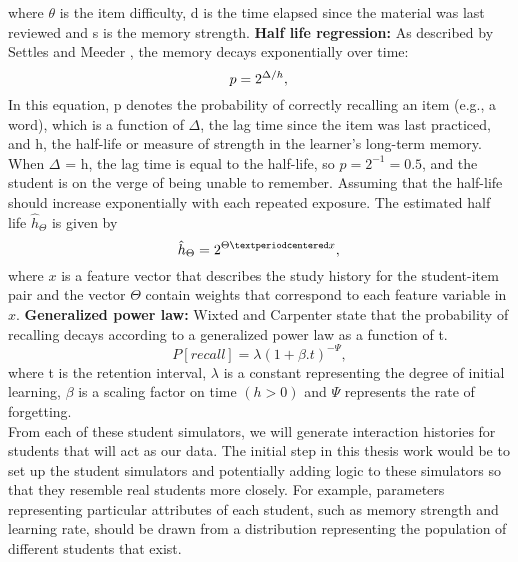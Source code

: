 \documentclass[12pt]{article}
\begin{document}
where $\theta$ is the item difficulty, d is the time elapsed since the material was last reviewed and s is the memory strength.
\vspace{5mm}
\newline
\textbf{Half life regression:}
\newline
{\color{blue}
As described by Settles and Meeder \cite{duolingo}, the memory decays exponentially over time:
\begin{equation} \label{eq:hlrp}
p = 2^{\Delta/h}, \\
\end{equation}
In this equation, p denotes the probability of correctly
recalling an item (e.g., a word), which is
a function of $\Delta$, the lag time since the item was
last practiced, and h, the half-life or measure of
strength in the learner’s long-term memory.
\newline
When $\Delta$ = h, the lag time is equal to the half-life,
so $p = 2^{-1} = 0.5$, and the student is on the
verge of being unable to remember.
\newline
Assuming that the half-life should increase exponentially
with each repeated exposure. The estimated half life
$\hat{h}_\Theta$ is given by
\begin{equation} \label{eq:hlrh}
\hat{h}_\Theta = 2^{\Theta·x}, \\
\end{equation}
where $x$ is a feature vector that describes the study history for the student-item pair and the vector $\Theta$ contain weights that correspond to each feature variable in $x$.
}
\vspace{5mm}
\newline
\textbf{Generalized power law:}
\newline
Wixted and Carpenter \cite{power_law} state that the probability of recalling decays according to a generalized power law as a function of t.
\begin{equation} \label{eq:gpl}
P[recall] = \lambda(1+\beta.t)^{-\Psi}, 
\end{equation}
 where {\color{blue}t is the retention interval}, $\lambda$ is a constant representing the degree of initial learning, $\beta$ is a scaling factor on time $(h>0)$ and $\Psi$ represents the rate of forgetting.\\

From each of these student simulators, we will generate interaction histories for students that will act as our data. The initial step in this thesis work would be to set up the student simulators and potentially adding logic to these simulators so that they resemble real students more closely. {\color{blue}For example, parameters representing particular attributes of each student, such as memory strength and learning rate, should be drawn from a distribution representing the population of different students that exist.}\\
\end{document}

